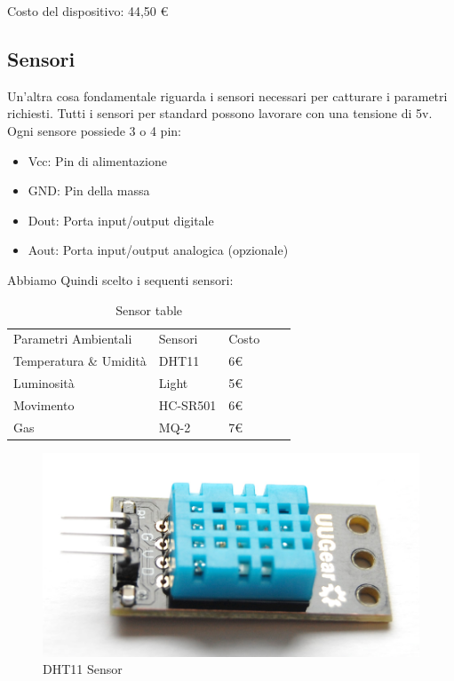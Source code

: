 Costo del dispositivo: 44,50 \euro

\subsection{Sensori}

Un'altra cosa fondamentale riguarda i sensori necessari per catturare i parametri richiesti.
Tutti i sensori per standard possono lavorare con una tensione di 5v.
Ogni sensore possiede 3 o 4 pin:

\begin{itemize}
	\item Vcc: Pin di alimentazione
	\item GND: Pin della massa
	\item Dout: Porta input/output digitale
	\item Aout: Porta input/output analogica (opzionale)
\end{itemize}

 Abbiamo Quindi scelto i sequenti sensori:

\begin{table}[]
	
	\begin{tabular}{lllll}
		\cline{1-3}
		\multicolumn{1}{|l|}{Parametri Ambientali} & \multicolumn{1}{l|}{Sensori} & \multicolumn{1}{l|}{Costo} &  &  \\ \cline{1-3}
		Temperatura \& Umidità                     & DHT11                        & 6\euro                          &  &  \\
		Luminosità                                 & Light                        & 5\euro                          &  &  \\
		Movimento                                  & HC-SR501                     & 6\euro                          &  &  \\
		Gas                                  & MQ-2                   & 7\euro                         &  &
	\end{tabular}
	\centering
	\caption{Sensor table}
	\label{my-label}
	
\end{table}

\begin{figure}
\centering
\includegraphics[width=0.7\linewidth]{Figures/Sensors&Rasp/dht11}
\caption[dht11]{DHT11 Sensor}
\label{fig:dht11}
\end{figure}


